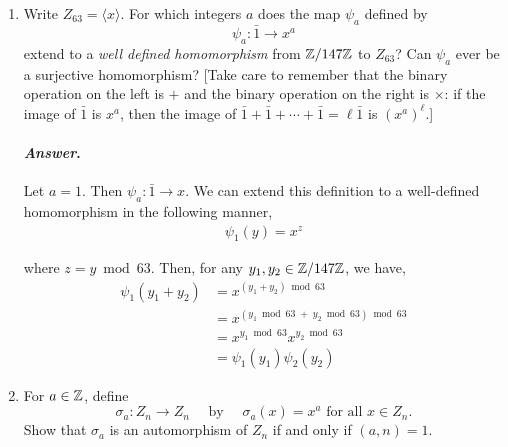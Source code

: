 \documentclass[11pt, reqno]{amsart}
\theoremstyle{plain}
\theoremstyle{definition}
\theoremstyle{example}
\newenvironment{ans}{\color{black}\medskip \paragraph*{\emph{Answer}.}}{\hfill \break  $~\!\!$ \dotfill \medskip }
\def\<{\langle} \def\>{\rangle}
\begin{document}
\begin{enumerate}[1.]
\begin{enumerate}
\begin{proof}
Now suppose there exists $y \in G$ such that $y \neq x^k$ for some $k \in \ZZ$. Note that since we know $|x| = n$, we can list out a subset of the elements in $G$. Hence, we have
\begin{align*}
\{1, x, x^2, \cdots, x^{n-1}, y\} \subset G
\end{align*}

However, note that $\{1, x, x^2, \cdots, x^{n-1}, y\} = n + 1 > |G|$. But since this is a subset of $G$, we have that,
\begin{align*}
|\{1, x, x^2, \cdots, x^{n-1}, y\}| \leq G
\end{align*}

So we have a contradiction and thus, this $y \neq x^k$ cannot exist. Hence, $G = \<x\>$.\\

Now consider the infinite group $(\mathbb{R}, +)$. We have that $|\mathbb{R}| = \infty = |2|$. However, $\mathbb{R} \neq \<1\>$ because $1 \in \mathbb{Z}$ and $\mathbb{Z}$ is closed under addition, so $\mathbb{R} \setminus \mathbb{Z}$ is not generated by $\<1\>$.
\end{proof}

\item Write $Z_{63} = \<x\>$. For which integers $a$ does the map $\psi_a$ defined by 
$$\psi_a : \bar{1} \to x^a$$
extend to a \emph{well defined homomorphism} from $\mathbb{Z}/147 \mathbb{Z}$ to $Z_{63}$? Can $\psi_a$ ever be a surjective homomorphism? 
{\small[Take care to remember that the binary operation on the left is $+$ and the binary operation on the right is $\times$: if the image of  $\bar{1}$ is $x^a$, then the image of $\bar{1} + \bar{1} + \cdots + \bar{1} = \ell\bar{1}$ is $(x^{a})^{\ell}$.]}
\begin{ans}
Let $a = 1$. Then $\psi_a: \bar{1} \to x$. We can extend this definition to a well-defined homomorphism in the following manner,
\begin{align*}
\psi_1(y) = x^z
\end{align*}

where $z = y \bmod 63$. Then, for any $y_1, y_2 \in \mathbb{Z}/147 \mathbb{Z}$, we have,
\begin{align*}
\psi_1(y_1 + y_2) &= x^{(y_1 + y_2) \bmod 63}\\
&= x^{(y_1 \bmod 63 \; + \; y_2 \bmod 63) \bmod 63}\\
&= x^{y_1 \bmod 63}x^{y_2 \bmod 63}\\
&= \psi_1(y_1)\psi_2(y_2)
\end{align*}
\end{ans}
\newpage
\item For $a \in \mathbb{Z}$, define 
$$\sigma_a: Z_n \to Z_n \quad \text{ by } \quad \sigma_a(x) = x^a \text{ for all } x \in Z_n.$$
Show that $\sigma_a$ is an automorphism of $Z_n$ if and only if $(a, n) = 1$. 


\end{enumerate}
\end{enumerate}
\end{document}
